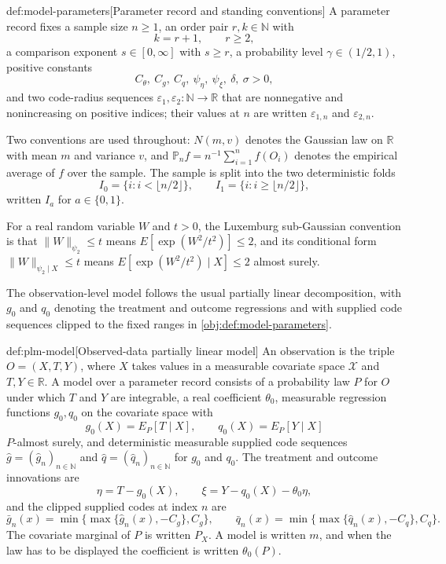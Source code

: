 \begin{definitionv}{def:model-parameters}[Parameter record and standing conventions]
A parameter record fixes a sample size \(n\ge 1\), an order pair \(r,k\in\mathbb N\) with
\[
 k=r+1,\qquad r\ge 2,
\]
a comparison exponent \(s\in[0,\infty]\) with \(s\ge r\), a probability level \(\gamma\in(1/2,1)\), positive constants
\[
 C_{\theta},\ C_g,\ C_q,\ \psi_{\eta},\ \psi_{\xi},\ \delta,\ \sigma>0,
\]
and two code-radius sequences \(\varepsilon_1,\varepsilon_2:\mathbb N\to\mathbb R\) that are nonnegative and nonincreasing on positive indices; their values at \(n\) are written \(\varepsilon_{1,n}\) and \(\varepsilon_{2,n}\).

Two conventions are used throughout: \(N(m,v)\) denotes the Gaussian law on \(\mathbb R\) with mean \(m\) and variance \(v\), and \(\mathbb P_n f=n^{-1}\sum_{i=1}^{n}f(O_i)\) denotes the empirical average of \(f\) over the sample.  The sample is split into the two deterministic folds
\[
 I_0=\{i:i<\lfloor n/2\rfloor\},\qquad I_1=\{i:i\ge\lfloor n/2\rfloor\},
\]
written \(I_a\) for \(a\in\{0,1\}\).

For a real random variable \(W\) and \(t>0\), the Luxemburg sub-Gaussian convention is that \(\lVert W\rVert_{\psi_2}\le t\) means \(E[\exp(W^2/t^2)]\le 2\), and its conditional form \(\lVert W\rVert_{\psi_2\mid X}\le t\) means \(E[\exp(W^2/t^2)\mid X]\le 2\) almost surely.
\end{definitionv}

The observation-level model follows the usual partially linear decomposition, with \(g_0\) and \(q_0\) denoting the treatment and outcome regressions and with supplied code sequences clipped to the fixed ranges in \cref{obj:def:model-parameters}.

\begin{definitionv}{def:plm-model}[Observed-data partially linear model]
An observation is the triple \(O=(X,T,Y)\), where \(X\) takes values in a measurable covariate space \(\mathcal X\) and \(T,Y\in\mathbb R\).  A model over a parameter record consists of a probability law \(P\) for \(O\) under which \(T\) and \(Y\) are integrable, a real coefficient \(\theta_0\), measurable regression functions \(g_0,q_0\) on the covariate space with
\[
 g_0(X)=E_P[T\mid X],\qquad q_0(X)=E_P[Y\mid X]
\]
\(P\)-almost surely, and deterministic measurable supplied code sequences \(\widehat g=(\widehat g_n)_{n\in\mathbb N}\) and \(\widehat q=(\widehat q_n)_{n\in\mathbb N}\) for \(g_0\) and \(q_0\).  The treatment and outcome innovations are
\[
 \eta=T-g_0(X),\qquad \xi=Y-q_0(X)-\theta_0\eta,
\]
and the clipped supplied codes at index \(n\) are
\[
 \bar g_n(x)=\min\{\max\{\widehat g_n(x),-C_g\},C_g\},\qquad
 \bar q_n(x)=\min\{\max\{\widehat q_n(x),-C_q\},C_q\}.
\]
The covariate marginal of \(P\) is written \(P_X\).  A model is written \(m\), and when the law has to be displayed the coefficient is written \(\theta_0(P)\).
\end{definitionv}

